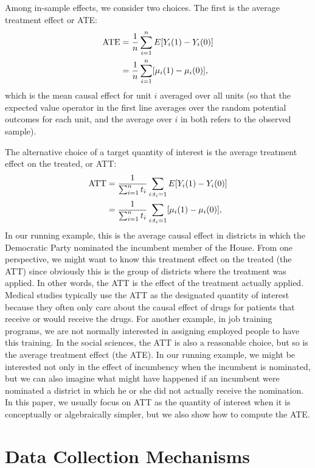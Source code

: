 \documentclass[11pt,titlepage]{article}
\begin{document}
Among in-sample effects, we consider two choices.  The first is the
average treatment effect or ATE:
\begin{align}
  \label{pate}
  \text{ATE} & = \frac{1}{n}\sum_{i=1}^n E[Y_i(1) - Y_i(0)] \notag\\
  &  = \frac{1}{n}\sum_{i=1}^n[\mu_i(1) - \mu_i(0)],
\end{align}
which is the mean causal effect for unit $i$ averaged over all units
(so that the expected value operator in the first line averages over
the random potential outcomes for each unit, and the average over $i$
in both refers to the observed sample).

The alternative choice of a target quantity of interest is the average
treatment effect on the treated, or ATT:
\begin{align}
  \label{att}
  \text{ATT} & = \frac{1}{\sum_{i=1}^n t_i}\sum_{i:t_i=1} E[Y_i(1) - Y_i(0)]\notag\\
  & = \frac{1}{\sum_{i=1}^n t_i}\sum_{i:t_i=1}[\mu_i(1) - \mu_i(0)],
\end{align}
In our running example, this is the average causal effect in districts
in which the Democratic Party nominated the incumbent member of the
House.  From one perspective, we might want to know this treatment
effect on the treated (the ATT) since obviously this is the group of
districts where the treatment was applied.  In other words, the ATT is
the effect of the treatment actually applied.  Medical studies
typically use the ATT as the designated quantity of interest because
they often only care about the causal effect of drugs for patients
that receive or would receive the drugs.  For another example, in job
training programs, we are not normally interested in assigning
employed people to have this training.  In the social sciences, the
ATT is also a reasonable choice, but so is the average treatment
effect (the ATE).  In our running example, we might be interested not
only in the effect of incumbency when the incumbent is nominated,
but we can also imagine what might have happened if an incumbent were
nominated a district in which he or she did not actually receive the
nomination.  In this paper, we usually focus on ATT as the quantity of
interest when it is conceptually or algebraically simpler, but we also
show how to compute the ATE.

\section{Data Collection Mechanisms}
\end{document}

